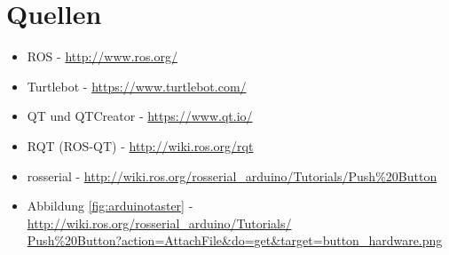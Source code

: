 \documentclass[a4paper,12pt,headsepline]{scrartcl}
\begin{document}
\section{Quellen}
\begin{itemize}
\item ROS - \href{http://www.ros.org/}{http://www.ros.org/}
\item Turtlebot - \href{https://www.turtlebot.com/}{https://www.turtlebot.com/}
\item QT und QTCreator - \href{https://www.qt.io/}{https://www.qt.io/}
\item RQT (ROS-QT) - \href{http://wiki.ros.org/rqt}{http://wiki.ros.org/rqt}
\item rosserial - \href{http://wiki.ros.org/rosserial\_arduino/Tutorials/Push\%20Button}{http://wiki.ros.org/rosserial\_arduino/Tutorials/Push\%20Button}
\item Abbildung \ref{fig:arduinotaster} - \href{http://wiki.ros.org/rosserial_arduino/Tutorials/Push\%20Button?action=AttachFile&do=get&target=button_hardware.png}{http://wiki.ros.org/rosserial\_arduino/Tutorials/\\Push\%20Button?action=AttachFile\&do=get\&target=button\_hardware.png}
\end{itemize}
\end{document}
